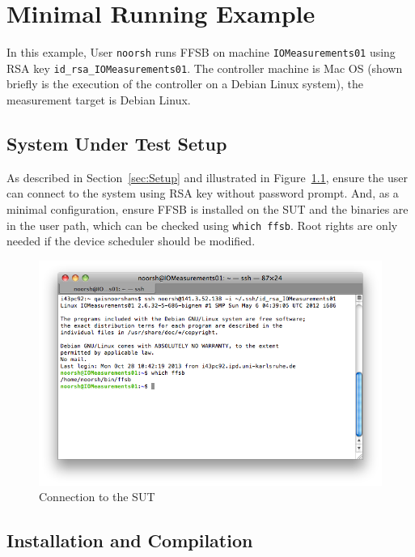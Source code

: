 \chapter{Minimal Running Example}
\label{ch:MinimalRunningExample}

In this example, User \texttt{noorsh} runs FFSB on machine \texttt{IOMeasurements01} using RSA key \texttt{id\_rsa\_IOMeasurements01}. The controller machine is Mac OS (shown briefly is the execution of the controller on a Debian Linux system), the measurement target is Debian Linux.

\section{System Under Test Setup}

As described in Section~\ref{sec:Setup} and illustrated in Figure~\ref{fig:ExampleSUT}, ensure the user can connect to the system using RSA key without password prompt. And, as a minimal configuration, ensure FFSB is installed on the SUT and the binaries are in the user path, which can be checked using \texttt{which ffsb}. Root rights are only needed if the device scheduler should be modified.

\begin{figure}[htbp]
	\centering
	\includegraphics[scale=0.375]{graphics/example/SUT.png}
	\caption{Connection to the SUT}
 	\label{fig:ExampleSUT}
\end{figure}

\section{Installation and Compilation}

